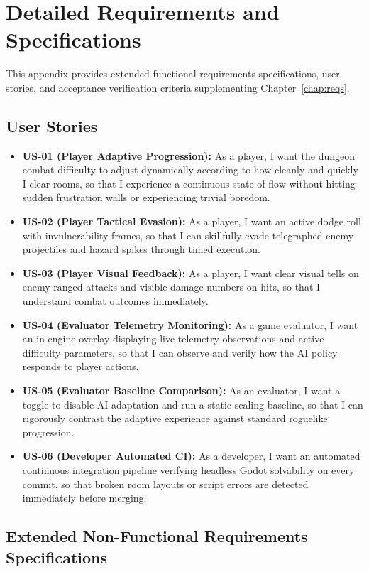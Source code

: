\chapter{Detailed Requirements and Specifications}
\label{app:reqs}

This appendix provides extended functional requirements specifications, user stories, and acceptance verification criteria supplementing Chapter~\ref{chap:reqs}.

\section{User Stories}
\begin{itemize}
    \item \textbf{US-01 (Player Adaptive Progression):} As a player, I want the dungeon combat difficulty to adjust dynamically according to how cleanly and quickly I clear rooms, so that I experience a continuous state of flow without hitting sudden frustration walls or experiencing trivial boredom.
    \item \textbf{US-02 (Player Tactical Evasion):} As a player, I want an active dodge roll with invulnerability frames, so that I can skillfully evade telegraphed enemy projectiles and hazard spikes through timed execution.
    \item \textbf{US-03 (Player Visual Feedback):} As a player, I want clear visual tells on enemy ranged attacks and visible damage numbers on hits, so that I understand combat outcomes immediately.
    \item \textbf{US-04 (Evaluator Telemetry Monitoring):} As a game evaluator, I want an in-engine overlay displaying live telemetry observations and active difficulty parameters, so that I can observe and verify how the AI policy responds to player actions.
    \item \textbf{US-05 (Evaluator Baseline Comparison):} As an evaluator, I want a toggle to disable AI adaptation and run a static scaling baseline, so that I can rigorously contrast the adaptive experience against standard roguelike progression.
    \item \textbf{US-06 (Developer Automated CI):} As a developer, I want an automated continuous integration pipeline verifying headless Godot solvability on every commit, so that broken room layouts or script errors are detected immediately before merging.
\end{itemize}

\section{Extended Non-Functional Requirements Specifications}

